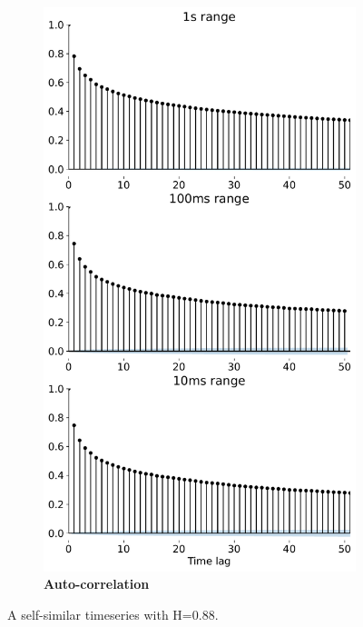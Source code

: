 \begin{figure}[t]
\begin{subfigure}[t]{0.33\linewidth}
\includegraphics[width=1\linewidth]{figs/acf.pdf}
    \caption{\textbf{Auto-correlation}}
	\label{fig:autocor}
\end{subfigure}
    \caption{\small{A self-similar timeseries with H=0.88.}}

\label{fig:motiv}
 \vspace{-2mm}
\end{figure}

